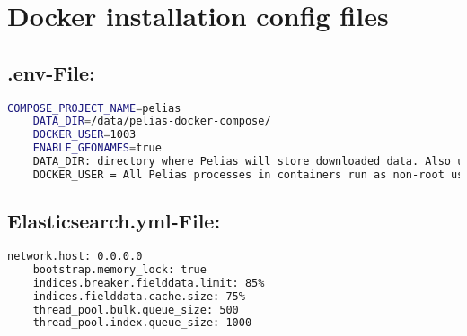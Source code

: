 \section{Docker installation config files} \label{Dicf}
\subsection{.env-File:}
\begin{lstlisting}[language=bash,breaklines=true]
	COMPOSE_PROJECT_NAME=pelias 
	DATA_DIR=/data/pelias-docker-compose/ 
	DOCKER_USER=1003 
	ENABLE_GEONAMES=true
	DATA_DIR: directory where Pelias will store downloaded data. Also used to build its other services. 
	DOCKER_USER = All Pelias processes in containers run as non-root users. This user ID will be used for accessing files on the host filesystem in DATA_DIR.
\end{lstlisting}

\subsection{Elasticsearch.yml-File:}
\begin{lstlisting}[language=bash,breaklines=true]
	network.host: 0.0.0.0 
	bootstrap.memory_lock: true 
	indices.breaker.fielddata.limit: 85% 
	indices.fielddata.cache.size: 75% 
	thread_pool.bulk.queue_size: 500 
	thread_pool.index.queue_size: 1000
\end{lstlisting}

